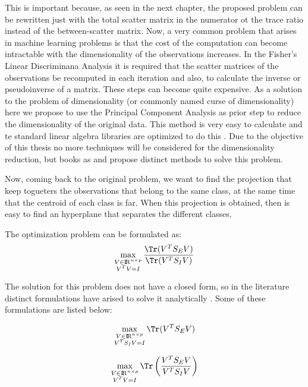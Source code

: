 This is important because, as seen in the next chapter, the proposed problem can be rewritten just with the total scatter matrix in the numerator ot the trace ratio instead of the between-scatter matrix. Now, a very common problem that arises in machine learning problems is that the cost of the computation can become intractable with the dimensionality of the observations increases. In the Fisher's Linear Discriminana Analysis it is required that the scatter matrices of the observations be recomputed in each iteration and also, to calculate the inverse or pseudoinverse of a matrix. These steps can become quite expensive. As a solution to the problem of dimensionality (or commonly named curse of dimensionality) here we propose to use the Principal Component Analysis as prior step to reduce the dimensionality of the original data. This method is very easy to calculate and te standard linear algebra libraries are optimized to do this \cite{ngo2012trace}. Due to the objective of this thesis no more techniques will be considered for the dimensionality reduction, but books as \cite{hastie2009elements} and \cite{duda2012pattern} propose distinct methods to solve this problem.

Now, coming back to the original problem, we want to find the projection that keep togueters the observations that belong to the same class, at the same time that the centroid of each class is far. When this projection is obtained, then is easy to find an hyperplane that separates the different classes.

\pagebreak
The optimization problem can be formulated as:
\begin{equation}\label{eq:2.5}
	\max_{\substack{V \in {\rm I\!R}^{n \times p} \\ V^TV = I}} \frac{\Tr(V^T S_E V)}{\Tr(V^T S_I V)}
\end{equation}

The solution for this problem does not have a closed form, so in the literature distinct formulations have arised to solve it analytically \cite{wang2007trace} \cite{fukunaga2013introduction}. Some of these formulations are listed below: 

\begin{equation}\label{eq:2.6}
	\max_{\substack{V \in {\rm I\!R}^{n \times p} \\ V^T S_I V = I}} \Tr(V^T S_E V)
\end{equation}

\begin{equation} \label{eq:2.7}
	\max_{\substack{V \in {\rm I\!R}^{n \times p} \\ V^T V = I}} \Tr\left( \frac{V^T S_E V}{V^T S_I V}\right) 	
\end{equation}

